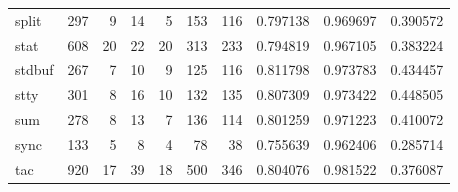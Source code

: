 \begin{longtable}{lrrrrrrrrr}
split     &                    297 &                                  9 &                                14 &                                5 &                               153 &                             116 &                                0.797138 &                               0.969697 &                             0.390572 \\
stat      &                    608 &                                 20 &                                22 &                               20 &                               313 &                             233 &                                0.794819 &                               0.967105 &                             0.383224 \\
stdbuf    &                    267 &                                  7 &                                10 &                                9 &                               125 &                             116 &                                0.811798 &                               0.973783 &                             0.434457 \\
stty      &                    301 &                                  8 &                                16 &                               10 &                               132 &                             135 &                                0.807309 &                               0.973422 &                             0.448505 \\
sum       &                    278 &                                  8 &                                13 &                                7 &                               136 &                             114 &                                0.801259 &                               0.971223 &                             0.410072 \\
sync      &                    133 &                                  5 &                                 8 &                                4 &                                78 &                              38 &                                0.755639 &                               0.962406 &                             0.285714 \\
tac       &                    920 &                                 17 &                                39 &                               18 &                               500 &                             346 &                                0.804076 &                               0.981522 &                             0.376087 \\

\end{longtable}
